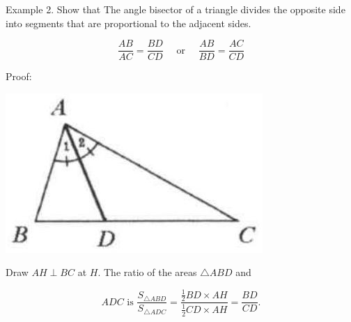 \documentclass[10pt]{article}
\begin{document}
Example 2. Show that The angle bisector of a triangle divides the opposite side into segments that are proportional to the adjacent sides.

\[
\frac{A B}{A C}=\frac{B D}{C D} \quad \text { or } \quad \frac{A B}{B D}=\frac{A C}{C D}
\]

Proof:
\begin{center}
\includegraphics[max width=\textwidth]{2025_04_17_97bc1f7e44d93c271a88g-075}
\end{center}

Draw \(A H \perp B C\) at \(H\). The ratio of the areas \(\triangle A B D\) and

\[
A D C \text { is } \frac{S_{\triangle A B D}}{S_{\triangle A D C}}=\frac{\frac{1}{2} B D \times A H}{\frac{1}{2} C D \times A H}=\frac{B D}{C D} .
\]
\end{document}
